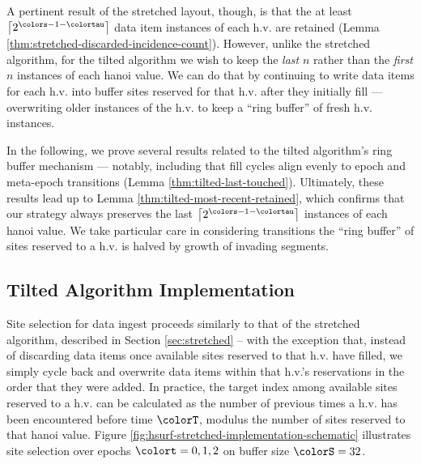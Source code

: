 A pertinent result of the stretched layout, though, is that the at least $\left\lceil2^{\colors - 1 - \colortau}\right\rceil$ data item instances of each h.v. are retained (Lemma \ref{thm:stretched-discarded-incidence-count}).
However, unlike the stretched algorithm, for the tilted algorithm we wish to keep the \textit{last} $n$ rather than the \textit{first} $n$ instances of each hanoi value.
We can do that by continuing to write data items for each h.v. into buffer sites reserved for that h.v. after they initially fill --- overwriting older instances of the h.v. to keep a ``ring buffer'' of fresh h.v. instances.

In the following, we prove several results related to the tilted algorithm's ring buffer mechanism --- notably, including that fill cycles align evenly to epoch and meta-epoch transitions (Lemma \ref{thm:tilted-last-touched}).
Ultimately, these results lead up to Lemma \ref{thm:tilted-most-recent-retained}, which confirms that our strategy always preserves the last $\left\lceil 2^{\colors - 1 - \colortau} \right\rceil$ instances of each hanoi value.
We take particular care in considering transitions the ``ring buffer'' of sites reserved to a h.v. is halved by growth of invading segments.











\subsection{Tilted Algorithm Implementation}
\label{sec:tilted-implementation}



Site selection for data ingest proceeds similarly to that of the stretched algorithm, described in Section \ref{sec:stretched} -- with the exception that, instead of discarding data items once available sites reserved to that h.v. have filled, we simply cycle back and overwrite data items within that h.v.'s reservations in the order that they were added.
In practice, the target index among available sites reserved to a h.v. can be calculated as the number of previous times a h.v. has been encountered before time $\colorT$, modulus the number of sites reserved to that hanoi value.
Figure \ref{fig:hsurf-stretched-implementation-schematic} illustrates site selection over epochs $\colort=0,1,2$ on buffer size $\colorS=32$.

